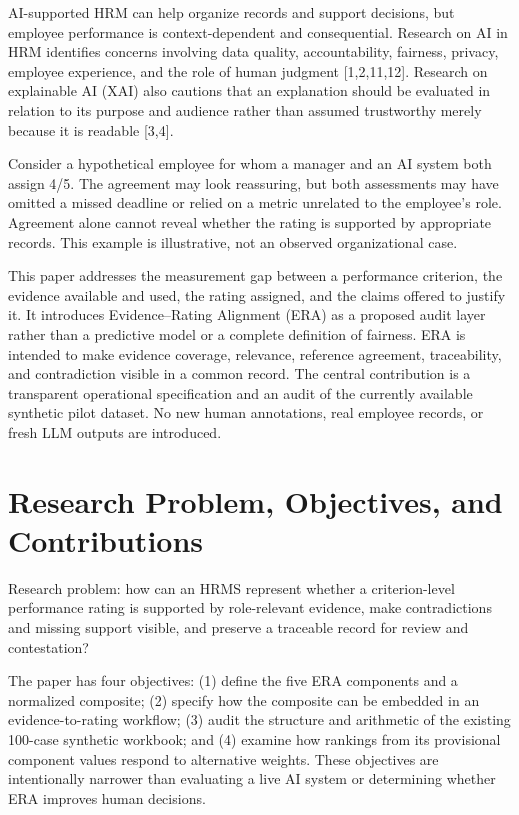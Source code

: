 \documentclass[
  10pt,
  a4paper,
  runningheads]{llncs}
\begin{document}
AI-supported HRM can help organize records and support decisions, but
employee performance is context-dependent and consequential. Research on
AI in HRM identifies concerns involving data quality, accountability,
fairness, privacy, employee experience, and the role of human judgment
{[}1,2,11,12{]}. Research on explainable AI (XAI) also cautions that an
explanation should be evaluated in relation to its purpose and audience
rather than assumed trustworthy merely because it is readable {[}3,4{]}.

Consider a hypothetical employee for whom a manager and an AI system
both assign 4/5. The agreement may look reassuring, but both assessments
may have omitted a missed deadline or relied on a metric unrelated to
the employee's role. Agreement alone cannot reveal whether the rating is
supported by appropriate records. This example is illustrative, not an
observed organizational case.

This paper addresses the measurement gap between a performance
criterion, the evidence available and used, the rating assigned, and the
claims offered to justify it. It introduces Evidence--Rating Alignment
(ERA) as a proposed audit layer rather than a predictive model or a
complete definition of fairness. ERA is intended to make evidence
coverage, relevance, reference agreement, traceability, and
contradiction visible in a common record. The central contribution is a
transparent operational specification and an audit of the currently
available synthetic pilot dataset. No new human annotations, real
employee records, or fresh LLM outputs are introduced.

\section{Research Problem, Objectives, and
Contributions}\label{research-problem-objectives-and-contributions}

Research problem: how can an HRMS represent whether a criterion-level
performance rating is supported by role-relevant evidence, make
contradictions and missing support visible, and preserve a traceable
record for review and contestation?

The paper has four objectives: (1) define the five ERA components and a
normalized composite; (2) specify how the composite can be embedded in
an evidence-to-rating workflow; (3) audit the structure and arithmetic
of the existing 100-case synthetic workbook; and (4) examine how
rankings from its provisional component values respond to alternative
weights. These objectives are intentionally narrower than evaluating a
live AI system or determining whether ERA improves human decisions.
\end{document}
